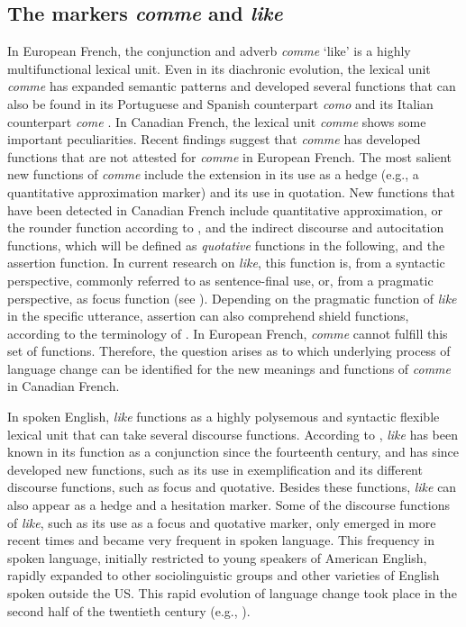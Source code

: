 \documentclass[output=paper]{langscibook}
\begin{document}
\subsection{The markers \textit{comme} and \textit{like}}\label{hennecke:sec:3.1}
In European French, the conjunction and adverb \textit{comme} ‘like’ is a highly multifunctional lexical unit. Even in its diachronic evolution, the lexical unit \textit{comme} has expanded semantic patterns and developed several functions that can also be found in its Portuguese and Spanish counterpart \textit{como} and its Italian counterpart \textit{come} \citep{Mihatsch.2009a}. In Canadian French, the lexical unit \textit{comme} shows some important peculiarities. Recent findings suggest that \textit{comme} has developed functions that are not attested for \textit{comme} in European French. The most salient new functions of \textit{comme} include the extension in its use as a hedge (e.g., a quantitative approximation marker) and its use in quotation. New functions that have been detected in Canadian French include quantitative approximation, or the rounder function according to \citet{Prince.1982}, and the indirect discourse and autocitation functions, which will be defined as \textit{quotative} functions in the following, and the assertion function. In current research on \textit{like}, this function is, from a syntactic perspective, commonly referred to as sentence-final use, or, from a pragmatic perspective, as focus function (see \citealt{Underhill.1988}). Depending on the pragmatic function of \textit{like} in the specific utterance, assertion can also comprehend shield functions, according to the terminology of \citet{Prince.1982}. In European French, \textit{comme} cannot fulfill this set of functions. Therefore, the question arises as to which underlying process of language change can be identified for the new meanings and functions of \textit{comme} in Canadian French. 

In spoken English, \textit{like} functions as a highly polysemous and syntactic flexible lexical unit that can take several discourse functions. According to \citet[49]{Meehan.1991}, \textit{like} has been known in its function as a conjunction since the fourteenth century, and has since developed new functions, such as its use in exemplification and its different discourse functions, such as focus and quotative. Besides these functions, \textit{like} can also appear as a hedge and a hesitation marker. Some of the discourse functions of \textit{like}, such as its use as a focus and quotative marker, only emerged in more recent times and became very frequent in spoken language. This frequency in spoken language, initially restricted to young speakers of American English, rapidly expanded to other sociolinguistic groups and other varieties of English spoken outside the US. This rapid evolution of language change took place in the second half of the twentieth century (e.g., \citealt{Buchstaller.2002,Buchstaller.2009,Vandelanotte.2009}). 
\end{document}

